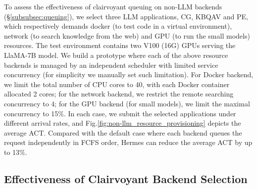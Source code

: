 To assess the effectiveness of clairvoyant queuing on non-LLM backends (\S\ref{subsubsec:queuing}), we select three LLM applications, CG, KBQAV and PE, which respectively demands docker (to test code in a virtual environment), network (to search knowledge from the web) and GPU (to run the small models) resources.
The test environment contains two V100 (16G) GPUs serving the LlaMA-7B model.
We build a prototype where each of the above resource backends is managed by an independent scheduler with limited service concurrency (for simplicity we manually set such limitation). 
For Docker backend, we limit the total number of CPU cores to 40, with each Docker container allocated 2 cores; for the network backend, we restrict the remote searching concurrency to 4; for the GPU backend (for small models), we limit the maximal concurrency to 15\%. %
In each case, we submit the selected applications under different arrival rates, 
and Fig.\ref{fig:non-llm_resource_provisioning} depicts the average ACT.
Compared with the default case where each backend queues the request independently in FCFS order, Hermes can reduce the average ACT by up to 13\%.





\subsection{Effectiveness of Clairvoyant Backend Selection}


